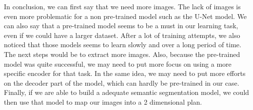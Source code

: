 In conclusion, we can first say that we need more images. The lack of images is even more problematic for a non pre-trained model such as the U-Net model. We can also say that a pre-trained model seems to be a must in our learning task, even if we could have a larger dataset. After a lot of training attempts, we also noticed that those models seems to learn slowly and over a long period of time. \\
The next steps would be to extract more images. Also, because the pre-trained model was quite successful, we may need to put more focus on using a more specific encoder for that task. In the same idea, we may need to put more efforts on the decoder part of the model, which can hardly be pre-trained in our case. Finally, if we are able to build a adequate semantic segmentation model, we could then use that model to map our images into a 2 dimensional plan.